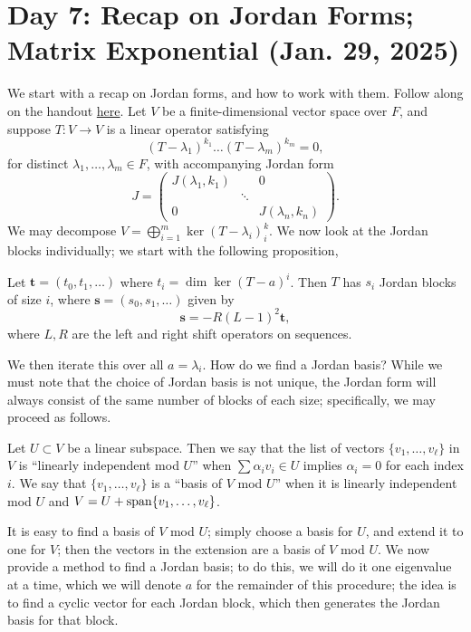\section{Day 7: Recap on Jordan Forms; Matrix Exponential (Jan. 29, 2025)}
We start with a recap on Jordan forms, and how to work with them. Follow along on the handout \href{https://q.utoronto.ca/courses/381819/files/35834900?module_item_id=6520178}{here}. Let $V$ be a finite-dimensional vector space over $F$, and suppose $T : V \to V$ is a linear operator satisfying
\[ (T - \lambda_1)^{k_1} \dots (T - \lambda_m)^{k_m} = 0, \]
for distinct $\lambda_1, \dots, \lambda_m \in F$, with accompanying Jordan form
\[ J = \begin{pmatrix} J(\lambda_1, k_1) & & 0 \\ & \ddots & \\ 0 & & J(\lambda_n, k_n) \end{pmatrix}. \]
We may decompose $V = \bigoplus_{i=1}^m \ker(T - \lambda_i)^k_i$. We now look at the Jordan blocks individually; we start with the following proposition,
\begin{simpleprop}
    Let $\textbf{t} = (t_0, t_1, \dots)$ where $t_i = \dim \ker(T - a)^i$. Then $T$ has $s_i$ Jordan blocks of size $i$, where $\textbf{s} = (s_0, s_1, \dots)$ given by
    \[ \textbf{s} = -R(L - 1)^2\textbf{t}, \]
    where $L, R$ are the left and right shift operators on sequences.
\end{simpleprop}
\noindent We then iterate this over all $a = \lambda_i$. How do we find a Jordan basis? While we must note that the choice of Jordan basis is not unique, the Jordan form will always consist of the same number of blocks of each size; specifically, we may proceed as follows.
\begin{definition}
    Let $U \subset V$ be a linear subspace. Then we say that the list of vectors $\{v_1, \dots, v_\ell\}$ in $V$ is ``linearly independent mod $U$'' when $\sum \alpha_i v_i \in U$ implies $\alpha_i = 0$ for each index $i$. We say that $\{v_1, \dots, v_\ell\}$ is a ``basis of $V$ mod $U$'' when it is linearly independent mod $U$ and $V = U + \operatorname{span}\{v_1, \dots, v_\ell\}$.
\end{definition}
\noindent It is easy to find a basis of $V$ mod $U$; simply choose a basis for $U$, and extend it to one for $V$; then the vectors in the extension are a basis of $V$ mod $U$. We now provide a method to find a Jordan basis; to do this, we will do it one eigenvalue at a time, which we will denote $a$ for the remainder of this procedure; the idea is to find a cyclic vector for each Jordan block, which then generates the Jordan basis for that block.
